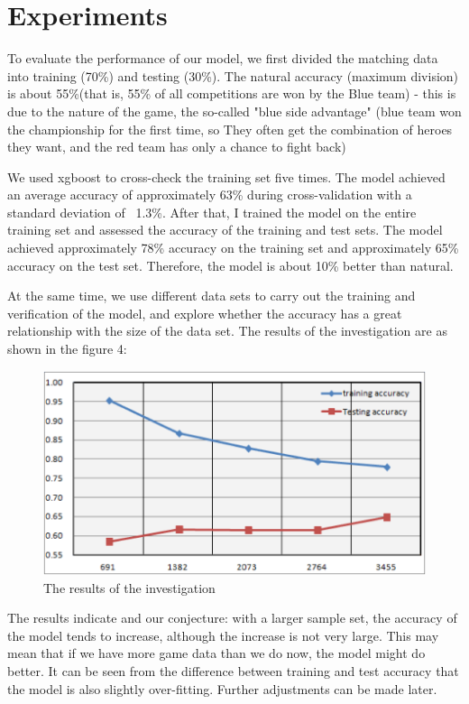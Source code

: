 \documentclass[fleqn,10pt]{wlscirep}
\begin{document}
\section*{Experiments}

To evaluate the performance of our model, we first divided the matching data into training (70\%) and testing (30\%). The natural accuracy (maximum division) is about 55\%(that is, 55\% of all competitions are won by the Blue team) - this is due to the nature of the game, the so-called "blue side advantage" (blue team won the championship for the first time, so They often get the combination of heroes they want, and the red team has only a chance to fight back)

We used xgboost to cross-check the training set five times. The model achieved an average accuracy of approximately 63\% during cross-validation with a standard deviation of ~1.3\%. After that, I trained the model on the entire training set and assessed the accuracy of the training and test sets. The model achieved approximately 78\% accuracy on the training set and approximately 65\% accuracy on the test set. Therefore, the model is about 10\% better than natural.

At the same time, we use different data sets to carry out the training and verification of the model, and explore whether the accuracy has a great relationship with the size of the data set. The results of the investigation are as shown in the figure 4:
\begin{figure}[ht]
\centering
\includegraphics[width=\linewidth]{4.png}
\caption{The results of the investigation}
\label{fig:4}
\end{figure}

The results indicate and our conjecture: with a larger sample set, the accuracy of the model tends to increase, although the increase is not very large. This may mean that if we have more game data than we do now, the model might do better. It can be seen from the difference between training and test accuracy that the model is also slightly over-fitting. Further adjustments can be made later.
\end{document}

